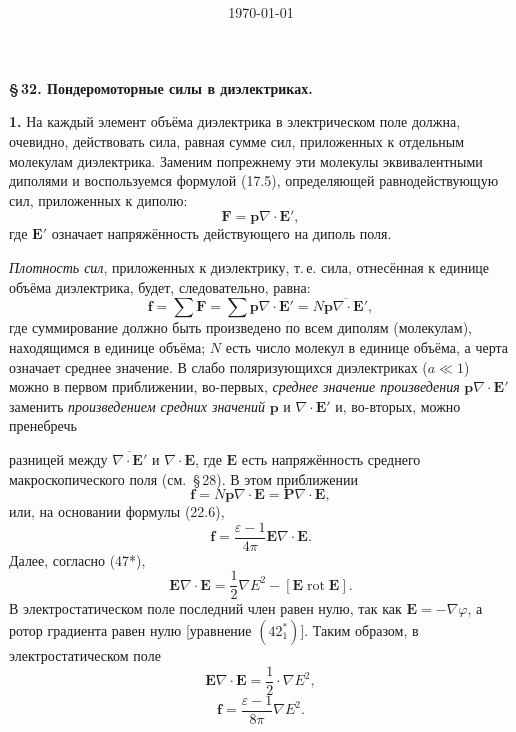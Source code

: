 \documentclass[a4paper,12pt]{article}
\title{\textbf{}}
\author{}
\date{\today}
\begin{document}
\bigskip
\noindent\textbf{\S\,32. Пондеромоторные силы в диэлектриках.}

\medskip
\textbf{1.} На каждый элемент объёма диэлектрика в электрическом поле
должна, очевидно, действовать сила, равная сумме сил, приложенных к
отдельным молекулам диэлектрика. Заменим попрежнему эти молекулы
эквивалентными диполями и воспользуемся формулой (17.5), определяющей
равнодействующую сил, приложенных к диполю:
$$
    \mathbf{F} = \mathbf{p}\nabla\cdot\mathbf{E}',
$$
где $\mathbf{E}'$ означает напряжённость действующего на диполь поля.

\textit{Плотность сил}, приложенных к диэлектрику, т.\,е. сила,
отнесённая к единице объёма диэлектрика, будет, следовательно, равна:
\begin{equation}
    \mathbf{f} = \sum\mathbf{F} = \sum\mathbf{p}\nabla\cdot\mathbf{E}'
              = N\overline{\mathbf{p}\nabla\cdot\mathbf{E}'},
    \tag{32.1}
\end{equation}
где суммирование должно быть произведено по всем диполям (молекулам),
находящимся в единице объёма; $N$ есть число молекул в единице объёма,
а черта означает среднее значение. В слабо поляризующихся диэлектриках
($a \ll 1$) можно в первом приближении, во-первых, \textit{среднее
значение произведения} $\mathbf{p}\nabla\cdot\mathbf{E}'$ заменить
\textit{произведением средних значений} $\mathbf{p}$ и
$\nabla\cdot\mathbf{E}'$ и, во-вторых, можно пренебречь


разницей между $\overline{\nabla\cdot\mathbf{E}'}$ и $\nabla\cdot\mathbf{E}$,
где $\mathbf{E}$ есть напряжённость среднего макроскопического поля
(см.\ §\,28). В этом приближении
$$
    \mathbf{f} = N\mathbf{p}\nabla\cdot\mathbf{E} = \mathbf{P}\nabla\cdot\mathbf{E},
$$
или, на основании формулы (22.6),
$$
    \mathbf{f} = \frac{\varepsilon-1}{4\pi}\mathbf{E}\nabla\cdot\mathbf{E}.
$$
Далее, согласно (47*),
$$
    \mathbf{E}\nabla\cdot\mathbf{E}
    = \frac{1}{2}\nabla E^2 - [\mathbf{E}\operatorname{rot}\mathbf{E}].
$$
В электростатическом поле последний член равен нулю, так как
$\mathbf{E} = -\nabla\varphi$, а ротор градиента равен нулю [уравнение
$(42^*_1)$]. Таким образом, в электростатическом поле
\begin{equation}
    \mathbf{E}\nabla\cdot\mathbf{E} = \frac{1}{2}\cdot\nabla E^2,
    \tag{32.2}
\end{equation}
\begin{equation}
    \mathbf{f} = \frac{\varepsilon-1}{8\pi}\nabla E^2.
    \tag{32.3}
\end{equation}
\end{document}
